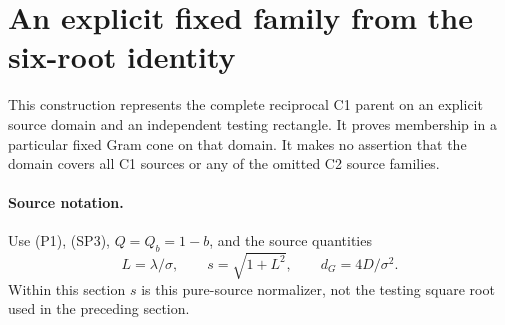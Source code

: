 \section{An explicit fixed family from the six-root identity}\label{sec:six}

This construction represents the complete reciprocal C1 parent on an
explicit source domain and an independent testing rectangle. It proves
membership in a particular fixed Gram cone on that domain. It makes no
assertion that the domain covers all C1 sources or any of the omitted C2
source families.

\paragraph{Source notation.}
Use (P1), (SP3), $Q=Q_b=1-b$, and the source quantities
\[
 L=\lambda/\sigma,\qquad s=\sqrt{1+L^2},\qquad d_G=4D/\sigma^2.
\]
Within this section $s$ is this pure-source normalizer, not the
testing square root used in the preceding section.


